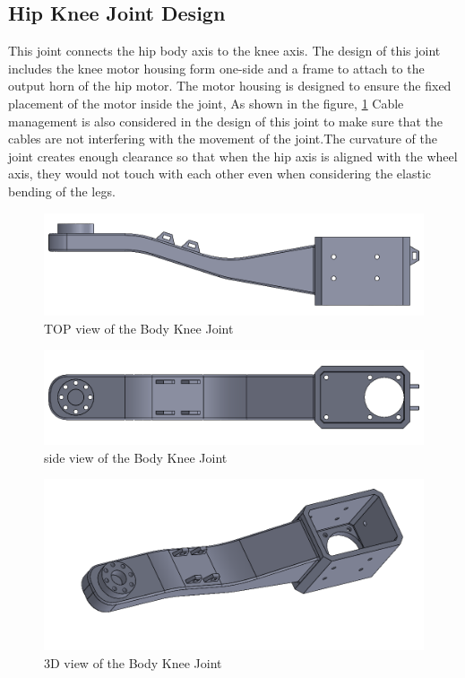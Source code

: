 \subsection{Hip Knee Joint Design}
This joint connects the hip body axis to the knee axis.
The design of this joint includes the knee motor housing form one-side and a frame to attach to the output horn of the hip motor.
The motor housing is designed to ensure the fixed placement of the motor inside the joint, As shown in the figure, \ref{fig:bodykneejoint1} Cable management is also considered in the design of this joint to make sure that the cables are not interfering with the movement of the joint.The curvature of the joint creates enough clearance so that when the hip axis is aligned with the wheel axis, they would not touch with each other even when considering the elastic bending of the legs.
\begin{figure}[h]
	\centering
	\includegraphics[width=1\linewidth]{Body_Knee_Joint_1}
	\caption[TOP view of the Body Knee Joint]{TOP view of the Body Knee Joint}
	\label{fig:bodykneejoint1}
\end{figure}
\begin{figure}[h]
	\centering
	\includegraphics[width=1\linewidth]{Body_Knee_Joint_2}
	\caption[Side view of the Body Knee Joint]{side view of the Body Knee Joint}
	\label{fig:bodykneejoint2}
\end{figure}
\begin{figure}[h]
	\centering
	\includegraphics[width=1\linewidth]{Body_Knee_Joint_3}
	\caption[3D view of the Body Knee Joint]{3D view of the Body Knee Joint}
	\label{fig:bodykneejoint3}
\end{figure}


